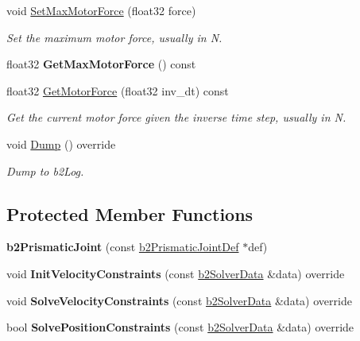 \begin{DoxyCompactItemize}
void \hyperlink{classb2_prismatic_joint_aa7817474aef15ca4815341479ac590e2}{Set\+Max\+Motor\+Force} (float32 force)
\begin{DoxyCompactList}\small\item\em Set the maximum motor force, usually in N. \end{DoxyCompactList}\item 
\mbox{\label{classb2_prismatic_joint_aea8d0701bdf00a38fd2f24d94ae74842}} 
float32 {\bfseries Get\+Max\+Motor\+Force} () const
\item 
\mbox{\label{classb2_prismatic_joint_aaf7a7fe2300d9fe7a810306e9cfbb41a}} 
float32 \hyperlink{classb2_prismatic_joint_aaf7a7fe2300d9fe7a810306e9cfbb41a}{Get\+Motor\+Force} (float32 inv\+\_\+dt) const
\begin{DoxyCompactList}\small\item\em Get the current motor force given the inverse time step, usually in N. \end{DoxyCompactList}\item 
\mbox{\label{classb2_prismatic_joint_a843ddb0f912085f3deb3ee7320d7ddc7}} 
void \hyperlink{classb2_prismatic_joint_a843ddb0f912085f3deb3ee7320d7ddc7}{Dump} () override
\begin{DoxyCompactList}\small\item\em Dump to b2\+Log. \end{DoxyCompactList}\end{DoxyCompactItemize}
\subsection*{Protected Member Functions}
\begin{DoxyCompactItemize}
\item 
\mbox{\label{classb2_prismatic_joint_ab1586a2334f7e32137fbd7f807e249ca}} 
{\bfseries b2\+Prismatic\+Joint} (const \hyperlink{structb2_prismatic_joint_def}{b2\+Prismatic\+Joint\+Def} $\ast$def)
\item 
\mbox{\label{classb2_prismatic_joint_a840e9885d49bf621c46df79733df21dc}} 
void {\bfseries Init\+Velocity\+Constraints} (const \hyperlink{structb2_solver_data}{b2\+Solver\+Data} \&data) override
\item 
\mbox{\label{classb2_prismatic_joint_a028c0ca03ca8437606d1175ca8de63d6}} 
void {\bfseries Solve\+Velocity\+Constraints} (const \hyperlink{structb2_solver_data}{b2\+Solver\+Data} \&data) override
\item 
\mbox{\label{classb2_prismatic_joint_ac841608a56e83f709e08b805ed8c92e3}} 
bool {\bfseries Solve\+Position\+Constraints} (const \hyperlink{structb2_solver_data}{b2\+Solver\+Data} \&data) override
\end{DoxyCompactItemize}
